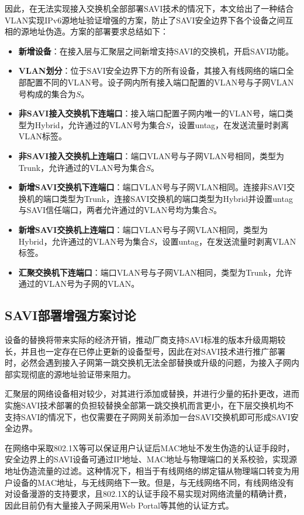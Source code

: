    因此，在无法实现接入交换机全部部署SAVI技术的情况下，本文给出了一种结合VLAN实现IPv6源地址验证增强的方案，防止了SAVI安全边界下各个设备之间互相的源地址伪造。方案的部署要求总结如下：
    \begin{itemize}
      \item \textbf{新增设备}：在接入层与汇聚层之间新增支持SAVI的交换机，开启SAVI功能。
      \item \textbf{VLAN划分}：位于SAVI安全边界下方的所有设备，其接入有线网络的端口全部配置不同的VLAN号。设子网内所有接入端口配置的VLAN号与子网VLAN号构成的集合为$S$。
      \item \textbf{非SAVI接入交换机下连端口}：接入端口配置子网内唯一的VLAN号，端口类型为Hybrid，允许通过的VLAN号为集合$S$，设置untag，在发送流量时剥离VLAN标签。
      \item \textbf{非SAVI接入交换机上连端口}：端口VLAN号与子网VLAN号相同，类型为Trunk，允许通过的VLAN号为集合$S$。
      \item \textbf{新增SAVI交换机下连端口}：端口VLAN号与子网VLAN相同。连接非SAVI交换机的端口类型为Trunk，连接SAVI交换机的端口类型为Hybrid并设置untag与SAVI信任端口，两者允许通过的VLAN号均为集合$S$。
      \item \textbf{新增SAVI交换机上连端口}：端口VLAN号与子网VLAN相同，类型为Hybrid，允许通过的VLAN号为集合$S$，设置untag，在发送流量时剥离VLAN标签。
      \item \textbf{汇聚交换机下连端口}：端口VLAN号与子网VLAN相同，类型为Trunk，允许通过的VLAN号为子网的VLAN。
    \end{itemize}

    \subsection{SAVI部署增强方案讨论}
    \label{IPv6_Security:access:discuss}
    设备的替换将带来实际的经济开销，推动厂商支持SAVI标准的版本升级周期较长，并且也一定存在已停止更新的设备型号，因此在对SAVI技术进行推广部署时，必然会遇到接入子网第一跳交换机无法全部替换或升级的问题，为接入子网内部实现彻底的源地址验证带来阻力。

    汇聚层的网络设备相对较少，对其进行添加或替换，并进行少量的拓扑更改，进而实施SAVI技术部署的负担较替换全部第一跳交换机而言更小，在下层交换机均不支持SAVI的情况下，也仅需要在子网网关前添加一台SAVI交换机即可形成SAVI安全边界。

    在网络中采取802.1X\cite{ieee802ieee}等可以保证用户认证后MAC地址不发生伪造的认证手段时，安全边界上的SAVI设备可通过IP地址、MAC地址与物理端口的关系校验，实现源地址伪造流量的过滤。这种情况下，相当于有线网络的绑定锚从物理端口转变为用户设备的MAC地址，与无线网络下一致。但是，与无线网络不同，有线网络没有对设备漫游的支持要求，且802.1X的认证手段不易实现对网络流量的精确计费，因此目前仍有大量接入子网采用Web Portal等其他的认证方式。


